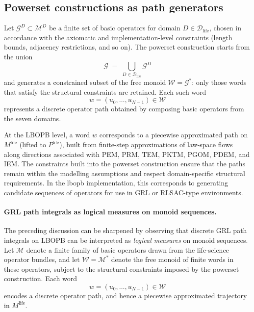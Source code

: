 \documentclass[11pt]{book}
\theoremstyle{plain}
\theoremstyle{definition}
\theoremstyle{remark}
\begin{document}
\subsection*{Powerset constructions as path generators}

Let $\mathcal{G}^{D} \subset \mathcal{M}^{D}$ be a finite set of basic
operators for domain $D \in \mathcal{D}_{\mathrm{life}}$, chosen in
accordance with the axiomatic and implementation-level constraints
(length bounds, adjacency restrictions, and so on). The powerset
construction starts from the union
\[
  \mathcal{G} \;=\; \bigcup_{D \in \mathcal{D}_{\mathrm{life}}}
  \mathcal{G}^{D}
\]
and generates a constrained subset of the free monoid
$\mathcal{W} = \mathcal{G}^{*}$: only those words that satisfy the
structural constraints are retained. Each such word
\[
  w = (u_{0},\dots,u_{N-1}) \in \mathcal{W}
\]
represents a discrete operator path obtained by composing basic
operators from the seven domains.

At the LBOPB level, a word $w$ corresponds to a piecewise approximated
path on $M^{\mathrm{life}}$ (lifted to $P^{\mathrm{life}}$), built
from finite-step approximations of law-space flows along directions
associated with PEM, PRM, TEM, PKTM, PGOM, PDEM, and IEM. The
constraints built into the powerset construction ensure that the
paths remain within the modelling assumptions and respect domain-specific
structural requirements. In the lbopb implementation, this corresponds
to generating candidate sequences of operators for use in GRL or
RLSAC-type environments.

\paragraph{GRL path integrals as logical measures on monoid sequences.}


The preceding discussion can be sharpened by observing that discrete
GRL path integrals on LBOPB can be interpreted as \emph{logical
measures} on monoid sequences. Let $\mathcal{M}$ denote a finite
family of basic operators drawn from the life-science operator
bundles, and let $\mathcal{W} = \mathcal{M}^{*}$ denote the free
monoid of finite words in these operators, subject to the structural
constraints imposed by the powerset construction. Each word
\[
  w = (u_{0},\dots,u_{N-1}) \in \mathcal{W}
\]
encodes a discrete operator path, and hence a piecewise approximated
trajectory in $M^{\mathrm{life}}$.
\end{document}
